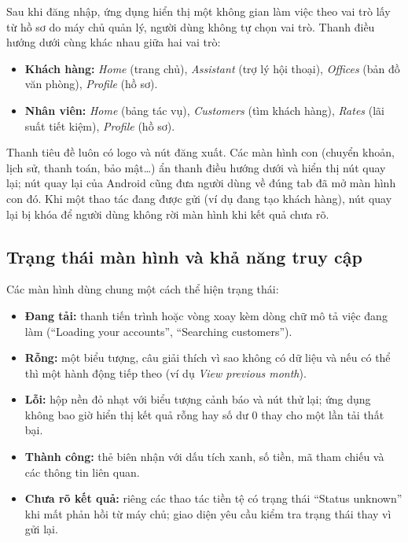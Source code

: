 Sau khi đăng nhập, ứng dụng hiển thị một không gian làm việc theo vai trò lấy từ hồ sơ do máy chủ quản lý, người dùng không tự chọn vai trò. Thanh điều hướng dưới cùng khác nhau giữa hai vai trò:
\begin{itemize}
  \item \textbf{Khách hàng:} \textit{Home} (trang chủ), \textit{Assistant} (trợ lý hội thoại), \textit{Offices} (bản đồ văn phòng), \textit{Profile} (hồ sơ).
  \item \textbf{Nhân viên:} \textit{Home} (bảng tác vụ), \textit{Customers} (tìm khách hàng), \textit{Rates} (lãi suất tiết kiệm), \textit{Profile} (hồ sơ).
\end{itemize}

Thanh tiêu đề luôn có logo và nút đăng xuất. Các màn hình con (chuyển khoản, lịch sử, thanh toán, bảo mật\ldots) ẩn thanh điều hướng dưới và hiển thị nút quay lại; nút quay lại của Android cũng đưa người dùng về đúng tab đã mở màn hình con đó. Khi một thao tác đang được gửi (ví dụ đang tạo khách hàng), nút quay lại bị khóa để người dùng không rời màn hình khi kết quả chưa rõ.

\subsection{Trạng thái màn hình và khả năng truy cập}
\label{sec:ch4-states-a11y}

Các màn hình dùng chung một cách thể hiện trạng thái:
\begin{itemize}
  \item \textbf{Đang tải:} thanh tiến trình hoặc vòng xoay kèm dòng chữ mô tả việc đang làm (``Loading your accounts'', ``Searching customers'').
  \item \textbf{Rỗng:} một biểu tượng, câu giải thích vì sao không có dữ liệu và nếu có thể thì một hành động tiếp theo (ví dụ \textit{View previous month}).
  \item \textbf{Lỗi:} hộp nền đỏ nhạt với biểu tượng cảnh báo và nút thử lại; ứng dụng không bao giờ hiển thị kết quả rỗng hay số dư 0 thay cho một lần tải thất bại.
  \item \textbf{Thành công:} thẻ biên nhận với dấu tích xanh, số tiền, mã tham chiếu và các thông tin liên quan.
  \item \textbf{Chưa rõ kết quả:} riêng các thao tác tiền tệ có trạng thái ``Status unknown'' khi mất phản hồi từ máy chủ; giao diện yêu cầu kiểm tra trạng thái thay vì gửi lại.
\end{itemize}

